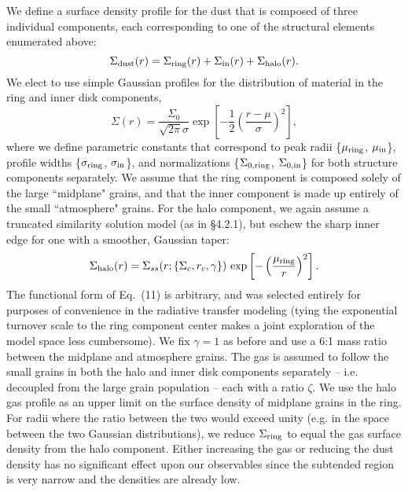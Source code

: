 {We define a surface density profile for the dust that is composed of three
individual components, each corresponding to one of the structural elements
enumerated above:
\begin{equation}
\Sigma_{\rm dust}(r) = \Sigma_{\rm ring}(r) + \Sigma_{\rm in}(r) + \Sigma_{\rm halo}(r).
\end{equation}
We elect to use simple Gaussian profiles for the distribution of material in the
ring and inner disk components,
\begin{equation}
\Sigma(r) = \frac{\Sigma_0}{\sqrt{2\pi}\sigma} \exp \left[-\frac{1}{2}\left(\frac{r-\mu}{\sigma}\right)^2\right],
\end{equation}
where we define parametric constants that correspond to peak radii \{$\mu_{\rm 
ring}$, $\mu_{\rm in}$\}, profile widths \{$\sigma_{\rm ring}$, $\sigma_{\rm 
in}$\}, and normalizations \{$\Sigma_{0, {\rm ring}}$, $\Sigma_{0, {\rm in}}$\}
for both structure components separately.  We assume that the ring component is
composed solely of the large ``midplane" grains, and that the inner component
is made up entirely of the small ``atmosphere" grains.  For the halo component,
we again assume a truncated similarity solution model (as in \S 4.2.1), but
eschew the sharp inner edge for one with a smoother, Gaussian taper:
\begin{equation}
\Sigma_{\rm halo}(r) = \Sigma_{ss}(r; \{\Sigma_c, r_c, \gamma\}) \, \exp \left[-\left(\frac{\mu_{\rm ring}}{r}\right)^2\right].
\end{equation}
The functional form of Eq.~(11) is arbitrary, and was selected entirely for
purposes of convenience in the radiative transfer modeling (tying the
exponential turnover scale to the ring component center makes a joint
exploration of the model space less cumbersome).  We fix $\gamma = 1$ as before 
and use a 6:1 mass ratio between the midplane and atmosphere grains.  The gas is
assumed to follow the small grains in both the halo and inner disk components
separately -- i.e. decoupled from the large grain population -- each with a 
ratio $\zeta$.  We use the halo gas profile as an upper limit on the surface 
density of midplane grains in the ring. For radii where the ratio between the 
two would exceed unity (e.g. in the space between the two Gaussian 
distributions), we reduce $\Sigma_{\rm ring}$ to equal the gas surface density 
from the halo component.  Either increasing the gas or reducing the dust density
has no significant effect upon our observables since the subtended region is 
very narrow and the densities are already low.

}

